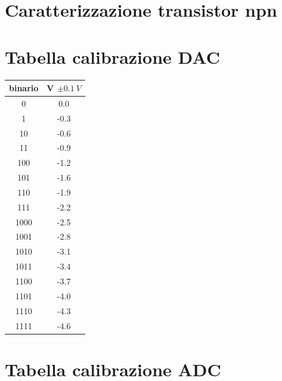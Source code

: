 \documentclass[journal]{IEEEtran}
\begin{document}

\clearpage

\begin{appendices}

\section{Caratterizzazione transistor npn}

\section{Tabella calibrazione DAC}

\centering
\begin{tabular}{cc}
binario & V $ \pm 0.1 \ V $ \\ \hline
0       & 0.0                          \\
1       & -0.3                       \\
10      & -0.6                       \\
11      & -0.9                       \\
100     & -1.2                       \\
101     & -1.6                       \\
110     & -1.9                       \\
111     & -2.2                       \\
1000    & -2.5                       \\
1001    & -2.8                       \\
1010    & -3.1                       \\
1011    & -3.4                       \\
1100    & -3.7                       \\
1101    & -4.0                       \\
1110    & -4.3                       \\
1111    & -4.6
\vspace{5 mm}
\label{tab:calibrazione_dac}
\end{tabular}


\section{Tabella calibrazione ADC}


\end{appendices}
\end{document}
